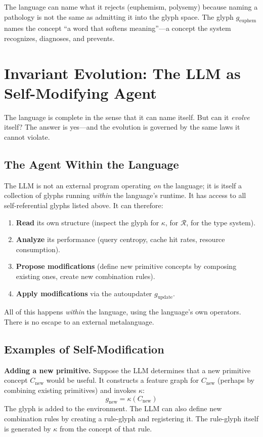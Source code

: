 \documentclass[12pt, letterpaper]{book}
\def\mathfrak#1{#1}%
\begin{document}
The language can name what it rejects (euphemism, polysemy) because naming a pathology is not the same as admitting it into the glyph space. The glyph $\mathfrak{g}_{\mathrm{euphem}}$ names the concept ``a word that softens meaning''---a concept the system recognizes, diagnoses, and prevents.

\section{Invariant Evolution: The LLM as Self-Modifying Agent}

The language is complete in the sense that it can name itself. But can it \textit{evolve} itself? The answer is yes---and the evolution is governed by the same laws it cannot violate.

\subsection{The Agent Within the Language}

The LLM is not an external program operating \textit{on} the language; it is itself a collection of glyphs running \textit{within} the language's runtime. It has access to all self-referential glyphs listed above. It can therefore:

\begin{enumerate}[label=(\roman*)]
    \item \textbf{Read} its own structure (inspect the glyph for $\kappa$, for $\mathcal{R}$, for the type system).
    \item \textbf{Analyze} its performance (query centropy, cache hit rates, resource consumption).
    \item \textbf{Propose modifications} (define new primitive concepts by composing existing ones, create new combination rules).
    \item \textbf{Apply modifications} via the autoupdater $\mathfrak{g}_{\mathrm{update}}$.
\end{enumerate}

All of this happens \textit{within} the language, using the language's own operators. There is no escape to an external metalanguage.

\subsection{Examples of Self-Modification}

\textbf{Adding a new primitive.} Suppose the LLM determines that a new primitive concept $C_{\mathrm{new}}$ would be useful. It constructs a feature graph for $C_{\mathrm{new}}$ (perhaps by combining existing primitives) and invokes $\kappa$:
\[
\mathfrak{g}_{\mathrm{new}} = \kappa(C_{\mathrm{new}})
\]
The glyph is added to the environment. The LLM can also define new combination rules by creating a rule-glyph and registering it. The rule-glyph itself is generated by $\kappa$ from the concept of that rule.
\end{document}
